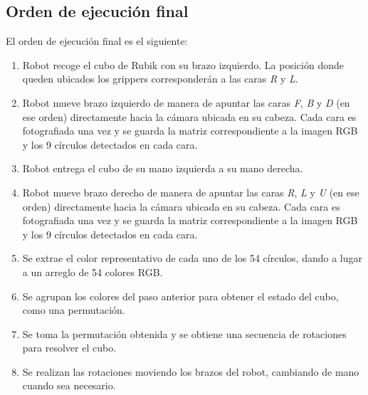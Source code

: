 \subsection{Orden de ejecución final}
El orden de ejecución final es el siguiente:
\begin{enumerate}
	\item Robot recoge el cubo de Rubik con su brazo izquierdo. La posición donde queden ubicados los grippers corresponderán a las caras \textit{R} y \textit{L}.
	\item Robot mueve brazo izquierdo de manera de apuntar las caras \textit{F}, \textit{B} y \textit{D} (en ese orden) directamente hacia la cámara ubicada en su cabeza. Cada cara es fotografiada una vez y se guarda la matriz correspondiente a la imagen RGB y los 9 círculos detectados en cada cara.
	\item Robot entrega el cubo de su mano izquierda a su mano derecha.
	\item Robot mueve brazo derecho de manera de apuntar las caras \textit{R}, \textit{L} y \textit{U} (en ese orden) directamente hacia la cámara ubicada en su cabeza. Cada cara es fotografiada una vez y se guarda la matriz correspondiente a la imagen RGB y los 9 círculos detectados en cada cara.
	\item Se extrae el color representativo de cada uno de los 54 círculos, dando a lugar a un arreglo de 54 colores RGB.
	\item Se agrupan los colores del paso anterior para obtener el estado del cubo, como una permutación.
	\item Se toma la permutación obtenida y se obtiene una secuencia de rotaciones para resolver el cubo.
	\item Se realizan las rotaciones moviendo los brazos del robot, cambiando de mano cuando sea necesario.
\end{enumerate}

